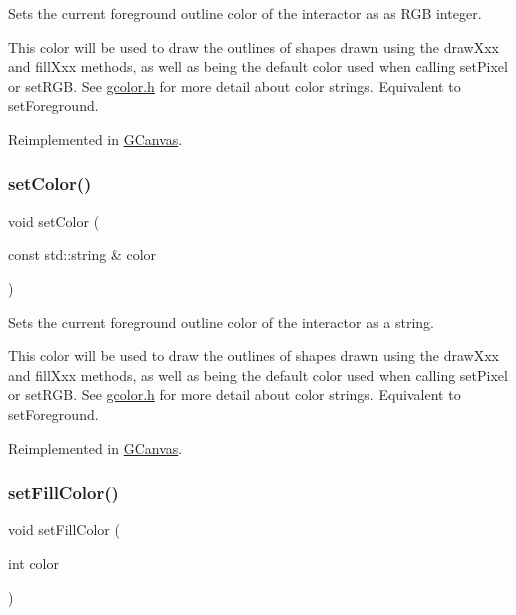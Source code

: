Sets the current foreground outline color of the interactor as as R\+GB integer. 

This color will be used to draw the outlines of shapes drawn using the draw\+Xxx and fill\+Xxx methods, as well as being the default color used when calling set\+Pixel or set\+R\+GB. See \mbox{\hyperlink{gcolor_8h_source}{gcolor.\+h}} for more detail about color strings. Equivalent to set\+Foreground. 

Reimplemented in \mbox{\hyperlink{classGCanvas_a292eb0ce61f3fdb1d28b17e1e34928f7}{G\+Canvas}}.

\mbox{\label{classGDrawingSurface_a61374df6c11b52cfbb0815decdbaebc6}} 
\subsubsection{\texorpdfstring{set\+Color()}{setColor()}\hspace{0.1cm}{\footnotesize\ttfamily [2/2]}}
{\footnotesize\ttfamily void set\+Color (\begin{DoxyParamCaption}\item[{const std\+::string \&}]{color }\end{DoxyParamCaption})\hspace{0.3cm}{\ttfamily [virtual]}}



Sets the current foreground outline color of the interactor as a string. 

This color will be used to draw the outlines of shapes drawn using the draw\+Xxx and fill\+Xxx methods, as well as being the default color used when calling set\+Pixel or set\+R\+GB. See \mbox{\hyperlink{gcolor_8h_source}{gcolor.\+h}} for more detail about color strings. Equivalent to set\+Foreground. 

Reimplemented in \mbox{\hyperlink{classGCanvas_ad148324da1b0340e84e24dffa577ffca}{G\+Canvas}}.

\mbox{\label{classGDrawingSurface_a47fad447b715f2f303538434eed26709}} 
\subsubsection{\texorpdfstring{set\+Fill\+Color()}{setFillColor()}\hspace{0.1cm}{\footnotesize\ttfamily [1/2]}}
{\footnotesize\ttfamily void set\+Fill\+Color (\begin{DoxyParamCaption}\item[{int}]{color }\end{DoxyParamCaption})\hspace{0.3cm}{\ttfamily [virtual]}}



